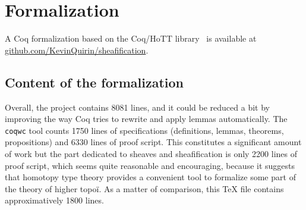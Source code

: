 \documentclass[preprint,9pt,numbers]{sigplanconf}
\DeclareMathOperator{\HProp}{HProp}
\begin{document}
\section{Formalization} 
\label{sec:formalization}

A Coq formalization based on the Coq/HoTT library~\cite{hottlib} is available at
\url{github.com/KevinQuirin/sheafification}.
%

\subsection{Content of the formalization}
\label{sec:cont-form}


Overall, %
the project
contains 8081 lines, and it could be reduced a bit by improving the
way Coq tries to rewrite and apply lemmas automatically. 
The \texttt{coqwc} tool counts 1750 lines of specifications
(definitions, lemmas, theorems, propositions) and 6330 lines of proof
script.
%
This constitutes a significant amount of work but the part dedicated
to sheaves and sheafification is only 2200 lines of proof script,
which seems quite reasonable and encouraging, because it suggests
that homotopy type theory provides a convenient tool to formalize some
part of the theory of higher topoï. As a matter of comparison, this
\TeX\xspace file contains approximatively 1800 lines.
\end{document}
